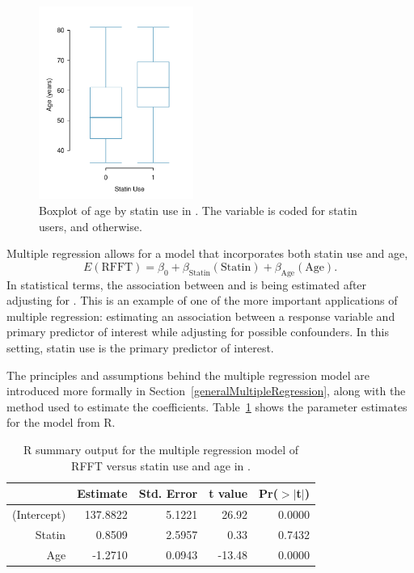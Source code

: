  \begin{figure}[h]
 	\centering
 	\includegraphics[width=0.45\textwidth]
 	{ch_multiple_linear_regression_oi_biostat/figures/prevendStatinAgeBoxPlot/prevendStatinAgeBoxPlot.pdf}
 	\caption{Boxplot of age by statin use in . The variable  is coded  for statin users, and  otherwise.}
 	\label{prevendStatinAgeBoxPlot}
 \end{figure}

Multiple regression allows for a model that incorporates both statin use and age,
 \[
    E(\text{RFFT}) = \beta_0 + \beta_{\text{Statin}}(\text{Statin}) + \beta_{\text{Age}}(\text{Age}).
	\label{RFFTStatinAgeEquation}
 \]
In statistical terms, the association between  and  is being estimated after adjusting for . This is an example of one of the more important applications of multiple regression: estimating an association between a response variable and primary predictor of interest while adjusting for possible confounders. In this setting, statin use is the primary predictor of interest.

The principles and assumptions behind the multiple regression model are introduced more formally in Section~\ref{generalMultipleRegression}, along with the method used to estimate the coefficients. Table~\ref{prevendRFFTStatinAgeRegression} shows the parameter estimates for the model from \textsf{R}. 
\begin{table}[ht]
\centering
\begin{tabular}{rrrrr}
  \hline
 & Estimate & Std. Error & t value & Pr($>$$|$t$|$) \\ 
  \hline
(Intercept) & 137.8822 & 5.1221 & 26.92 & 0.0000 \\ 
  Statin & 0.8509 & 2.5957 & 0.33 & 0.7432 \\ 
  Age & -1.2710 & 0.0943 & -13.48 & 0.0000 \\ 
   \hline
\end{tabular}
\caption{\textsf{R} summary output for the multiple regression model of RFFT versus statin use and age in .} 
\label{prevendRFFTStatinAgeRegression}
\end{table}
 
